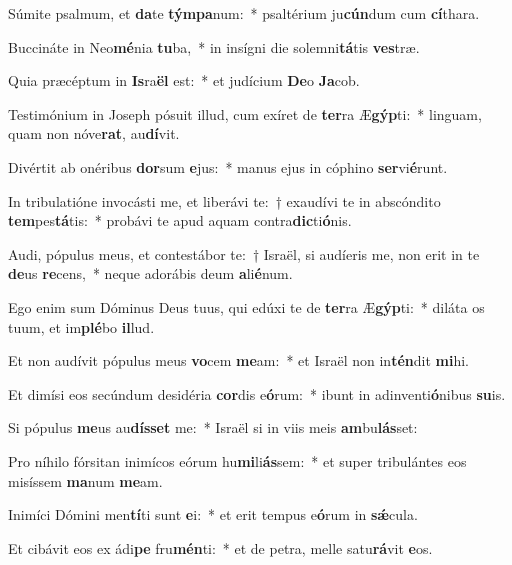\item Súmite psalmum, et \textbf{da}te \textbf{tým}\textbf{pa}num:~* psaltérium ju\textbf{cún}dum cum \textbf{cí}thara.
\item Buccináte in Neo\textbf{mé}nia \textbf{tu}ba,~* in insígni die solemni\textbf{tá}tis \textbf{ves}træ.
\item Quia præcéptum in \textbf{Is}ra\textbf{ël} est:~* et judícium \textbf{De}o \textbf{Ja}cob.
\item Testimónium in Joseph pósuit illud, cum exíret de \textbf{ter}ra Æ\textbf{gýp}ti:~* linguam, quam non nóve\textbf{rat}, au\textbf{dí}vit.
\item Divértit ab onéribus \textbf{dor}sum \textbf{e}jus:~* manus ejus in cóphino \textbf{ser}vi\textbf{é}runt.
\item In tribulatióne invocásti me, et liberávi te:~† exaudívi te in abscóndito \textbf{tem}pes\textbf{tá}tis:~* probávi te apud aquam contra\textbf{dic}ti\textbf{ó}nis.
\item Audi, pópulus meus, et contestábor te:~† Israël, si audíeris me, non erit in te \textbf{de}us \textbf{re}cens,~* neque adorábis deum \textbf{a}li\textbf{é}num.
\item Ego enim sum Dóminus Deus tuus, qui edúxi te de \textbf{ter}ra Æ\textbf{gýp}ti:~* diláta os tuum, et im\textbf{plé}bo \textbf{il}lud.
\item Et non audívit pópulus meus \textbf{vo}cem \textbf{me}am:~* et Israël non in\textbf{tén}dit \textbf{mi}hi.
\item Et dimísi eos secúndum desidéria \textbf{cor}dis e\textbf{ó}rum:~* ibunt in adinventi\textbf{ó}nibus \textbf{su}is.
\item Si pópulus \textbf{me}us au\textbf{dís}\textbf{set} me:~* Israël si in viis meis \textbf{am}bu\textbf{lás}set:
\item Pro níhilo fórsitan inimícos eórum hu\textbf{mi}li\textbf{ás}sem:~* et super tribulántes eos misíssem \textbf{ma}num \textbf{me}am.
\item Inimíci Dómini men\textbf{tí}ti sunt \textbf{e}i:~* et erit tempus e\textbf{ó}rum in \textbf{sǽ}cula.
\item Et cibávit eos ex ádi\textbf{pe} fru\textbf{mén}ti:~* et de petra, melle satu\textbf{rá}vit \textbf{e}os.
